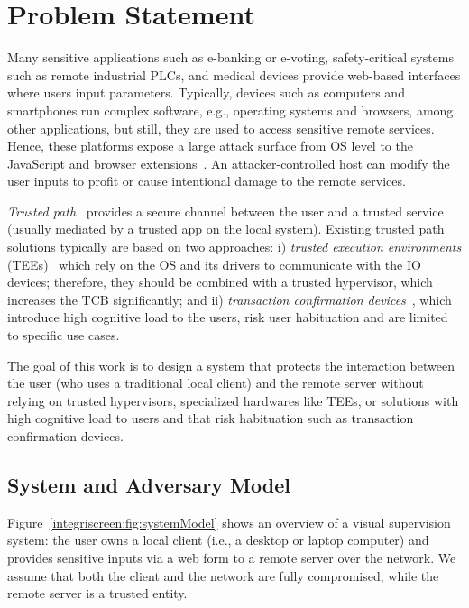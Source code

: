 \section{Problem Statement}
\label{sec:problemStatement_IS}

Many sensitive applications such as e-banking or e-voting, safety-critical systems such as remote industrial PLCs, and medical devices provide web-based interfaces where users input parameters.
Typically, devices such as computers and smartphones run complex software, e.g., operating systems and browsers, among other applications, but still, they are used to access sensitive remote services. Hence, these platforms expose a large attack surface from OS level to the JavaScript and browser extensions~\cite{driveByDownload, extensionSecurity, extensionSecurity1, extensionHack1, microsoftPatches, kernelSecurity, linuxMalware, zeusMalware, wannacry}. An attacker-controlled host can modify the user inputs to profit or cause intentional damage to the remote services.

\emph{Trusted path}~\cite{x86} provides a secure channel between the user and a trusted service (usually mediated by a trusted app on the local system).
Existing trusted path solutions typically are based on two approaches: i) \textit{trusted execution environments} (TEEs)~\cite{sgxio} which rely on the OS and its drivers to communicate with the IO devices; therefore, they should be combined with a trusted hypervisor, which increases the TCB significantly; and ii) \textit{transaction confirmation devices}~\cite{filyanov2011uni}, which introduce high cognitive load to the users, risk user habituation and are limited to specific use cases.

The goal of this work is to design a system that protects the interaction between the user (who uses a traditional local client) and the remote server without relying on trusted hypervisors, specialized hardwares like TEEs, or solutions with high cognitive load to users and that risk habituation such as transaction confirmation devices.

\subsection{System and Adversary Model}
\label{sec:problemStatement:systemMode}

Figure~\ref{integriscreen:fig:systemModel} shows an overview of a visual supervision system: the user owns a local client (i.e., a desktop or laptop computer) and provides sensitive inputs via a web form to a remote server over the network. We assume that both the client and the network are fully compromised, while the remote server is a trusted entity. 

